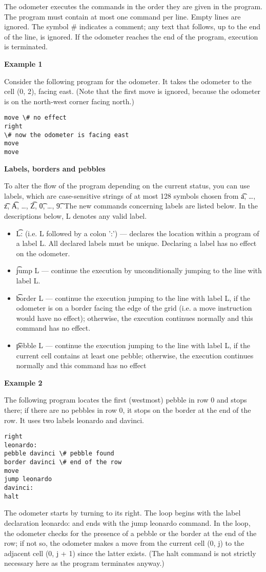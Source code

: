 The odometer executes the commands in the order they are given in the program. The program
must contain at most one command per line. Empty lines are ignored. The symbol \# indicates a comment; any text that follows, up to the end of the line, is ignored. If the odometer reaches the end of the program, execution is terminated. 


{\bf Example 1 }

Consider the following program for the odometer. It takes the odometer to the cell (0, 2), facing east. (Note that the first move is ignored, because the odometer is on the north-west corner facing north.)
\begin{lstlisting}
move \# no effect
right
\# now the odometer is facing east
move
move
\end{lstlisting} 


{\bf Labels, borders and pebbles} 

To alter the flow of the program depending on the current status, you can use labels, which are case-sensitive strings of at most 128 symbols chosen from \t{a}, \dots, \t{z}, \t{A}, \dots, \t{Z}, \t{0}, \dots, \t{9}. The new commands concerning labels are listed below. In the descriptions below, L denotes any valid label.
\begin{itemize}
\item \t{L:} (i.e. L followed by a colon ':') --- declares the location within a program of a label L. All declared labels must be unique. Declaring a label has no effect on the odometer.
\item \t{jump L} --- continue the execution by unconditionally jumping to the line with label L.
\item \t{border L} --- continue the execution jumping to the line with label L, if the odometer is on a border facing the edge of the grid (i.e. a move instruction would have no effect); otherwise, the execution continues normally and this command has no effect.
\item \t{pebble L} --- continue the execution jumping to the line with label L, if the current cell contains at least one pebble; otherwise, the execution continues normally and this command has no effect
\end{itemize} 


{\bf Example 2 }

The following program locates the first (westmost) pebble in row 0 and stops there; if there are no pebbles in row 0, it stops on the border at the end of the row. It uses two labels leonardo and davinci.
\begin{lstlisting}
right
leonardo:
pebble davinci \# pebble found
border davinci \# end of the row
move
jump leonardo
davinci:
halt
\end{lstlisting}
The odometer starts by turning to its right. The loop begins with the label declaration leonardo: and ends with the jump leonardo command. In the loop, the odometer checks for the presence of a pebble or the border at the end of the row; if not so, the odometer makes a move from the current cell (0, j) to the adjacent cell (0, j + 1) since the latter exists. (The halt command is not strictly necessary here as the program terminates anyway.)




